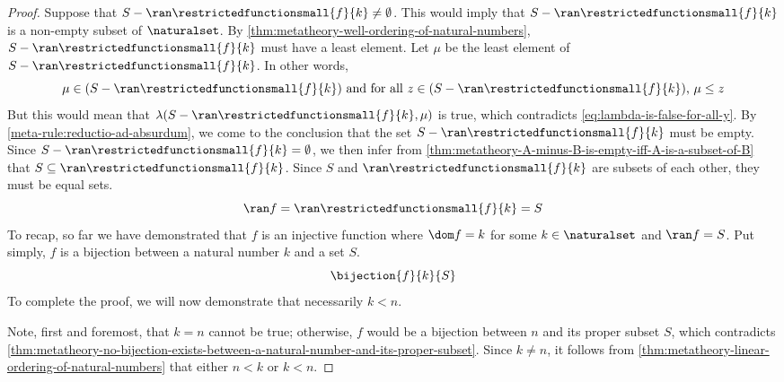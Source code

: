 \begin{proof}
    \vspace{0.3cm}
    \noindent
    Suppose that \( S - \ran \restrictedfunctionsmall{f}{k} \neq \emptyset \).
    This would imply that \( S - \ran \restrictedfunctionsmall{f}{k} \) is a non-empty subset of \( \naturalset \).
    By \cref{thm:metatheory-well-ordering-of-natural-numbers}, \( S - \ran \restrictedfunctionsmall{f}{k} \) must have a least element.
    Let \( \mu \) be the least element of \( S - \ran \restrictedfunctionsmall{f}{k} \).
    In other words,
    \begin{equation*}
        \mu \in \mleft( S - \ran \restrictedfunctionsmall{f}{k} \mright) \ \text{and for all \( z \in \mleft( S - \ran \restrictedfunctionsmall{f}{k} \mright) \), \( \mu \leq z \)}
    \end{equation*}
    But this would mean that \( \lambda(S - \ran \restrictedfunctionsmall{f}{k}, \mu) \) is true, which contradicts \eqref{eq:lambda-is-false-for-all-y}.
    By \cref{meta-rule:reductio-ad-absurdum}, we come to the conclusion that the set \( S - \ran \restrictedfunctionsmall{f}{k} \) must be empty.
    Since \( S - \ran \restrictedfunctionsmall{f}{k} = \emptyset \), we then infer from \cref{thm:metatheory-A-minus-B-is-empty-iff-A-is-a-subset-of-B}
    that \( S \subseteq \ran \restrictedfunctionsmall{f}{k} \).
    Since \( S \) and \( \ran \restrictedfunctionsmall{f}{k} \) are subsets of each other, they must be equal sets.
    \begin{equation*}
       \ran f = \ran \restrictedfunctionsmall{f}{k} = S
    \end{equation*}
    To recap, so far we have demonstrated that \( f \) is an injective function where \( \dom f = k \) for some \( k \in \naturalset \) and \( \ran f = S \).
    Put simply, \( f \) is a bijection between a natural number \( k \) and a set \( S \).
    \begin{equation*}
        \bijection{f}{k}{S}
    \end{equation*}
    To complete the proof, we will now demonstrate that necessarily \( k < n \).

    \vspace{0.3cm}
    \noindent
    Note, first and foremost, that \( k = n \) cannot be true; otherwise, \( f \) would be a bijection between \( n \) and its proper subset \( S \),
    which contradicts \cref{thm:metatheory-no-bijection-exists-between-a-natural-number-and-its-proper-subset}.
    Since \( k \neq n \), it follows from \cref{thm:metatheory-linear-ordering-of-natural-numbers} that either \( n < k \) or \( k < n \).


\end{proof}
